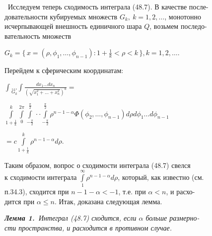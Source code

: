 ﻿\documentclass[twocolumn]{article}
\begin{document}
\ Исследуем теперь сходимость интеграла (48.7). В качестве после-\\довательности кубируемых множеств $G_k,\ k = 1, 2,\ldots$,
монотонно\\ исчерпывающей внешность единичного шара $Q$, возьмем последо-\\вательность множеств
\begin{center}
$G_k = \{\,x = (\rho,\phi_1,\ldots,\phi_{n-1}):1 + \frac1k < \rho < k\,\}, k = 1,2,\ldots$.
\end{center}
\hspace{5pt} Перейдем к сферическим координатам:
\begin{center}
$\int \underset{G_k}{\ldots} \int\frac{dx_1\ldots dx_n}{(\sqrt{x^2_1+\ldots +x^2_n})^a} = $
\end{center}
\begin{center}
$\int\limits^k_{1 + \frac1k}\int\limits_0^{2\pi}\int\limits_{-\frac{\pi}{2}}^{\frac{\pi}{2}}\cdot \cdot \int\limits_{-\frac{\pi}{2}}^{\frac{\pi}{2}}\rho^{n-1-\alpha}\Phi(\phi_2,\ldots,\phi_{n-1})d\rho d\phi_1\ldots d\phi_{n-1}$
\end{center}

\newpage

\begin{center}
$= c \int\limits^k_{1 + \frac1k} \rho^{n-1-\alpha}d\rho$.
\end{center}
\hspace{5pt} Таким образом, вопрос о сходимости интеграла (48.7) свелся\\ к сходимости интеграла $\int\limits_1^{\infty}\rho^{n-1-\alpha}d\rho$, который, как известно (см.\\п.34.3), сходится при $n - 1 - \alpha < -1$, т.е. при $\alpha < n$, и расхо-\\дится при $\alpha\le n$. Итак, доказана следующая лемма.

{\slshape {\bfseries{Лемма 1.\ }}\it Интеграл (48.7) сходится, если $\alpha$ больше размерно-\\сти пространства, и расходится в противном случае.}
\end{document}

